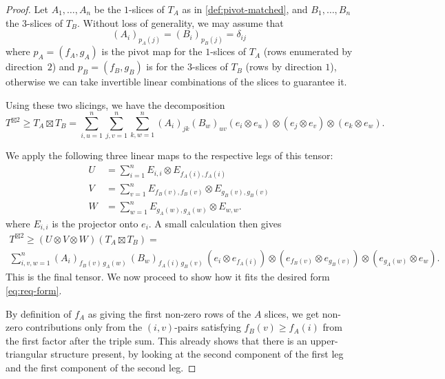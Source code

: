 \documentclass[10pt,a4paper]{amsart}
\newcommand{\beqn}{\begin{equation*}}
\newcommand{\beq}{\begin{equation}}
\newcommand{\eeqn}{\end{equation*}}
\newcommand{\eeq}{\end{equation}}
\begin{document}
\begin{proof}
Let $A_1,\dots,A_n$ be the $1$-slices of $T_A$ as in \autoref{def:pivot-matched}, and $B_1,\dots,B_n$ the $3$-slices of $T_B$. Without loss of generality, we may assume that
\beq\label{eq:pivot1}
(A_i)_{p_A(j)} = (B_i)_{p_B(j)} = \delta_{ij}
\eeq
where $p_A=(f_A,g_A)$ is the pivot map for the $1$-slices of $T_A$ (rows enumerated by direction~$2$) and $p_B=(f_B,g_B)$ is for the $3$-slices of $T_B$ (rows by direction $1$), otherwise we can take invertible linear combinations of the slices to guarantee it.

%
%
%
%
Using these two slicings, we have the decomposition
\beqn
T^{\boxtimes 2}\geq T_A\boxtimes T_B
=
\sum_{i,u=1}^n\sum_{j,v=1}^n\sum_{k,w=1}^n (A_i)_{jk}(B_w)_{uv} (e_i\otimes e_u)\otimes (e_j\otimes e_v)\otimes (e_k\otimes e_w).
\eeqn

We apply the following three linear maps to the respective legs of this tensor:
\begin{align*}
U &= \sum_{i=1}^n E_{i,i}\otimes E_{f_A(i),f_A(i)}\\
V &= \sum_{v=1}^n E_{f_B(v),f_B(v)}\otimes E_{g_B(v),g_B(v)}\\
W &= \sum_{w=1}^nE_{g_A(w),g_A(w)}\otimes E_{w,w}.
\end{align*}
where $E_{i,i}$ is the projector onto $e_i$.
A small calculation then gives
\begin{multline*}
T^{\boxtimes 2}\geq(U\otimes V\otimes W)(T_A\boxtimes T_B)
=\\
\sum_{i,v,w=1}^n
(A_i)_{f_B(v)\,g_A(w)}\, (B_w)_{f_A(i)\,g_B(v)}\, 
(e_i\otimes e_{f_A(i)})\otimes (e_{f_B(v)}\otimes e_{g_B(v)})\otimes (e_{g_A(w)}\otimes e_w).
\end{multline*}
This is the final tensor. We now proceed to show how it fits the desired form \eqref{eq:req-form}.

By definition of $f_A$ as giving the first non-zero rows of the $A$ slices, we get non-zero contributions only from the $(i,v)$-pairs satisfying $f_B(v) \geq f_A(i)$ from the first factor after the triple sum.
This already shows that there is an upper-triangular structure present, by looking at the second component of the first leg and the first component of the second leg.


\end{proof}
\end{document}
